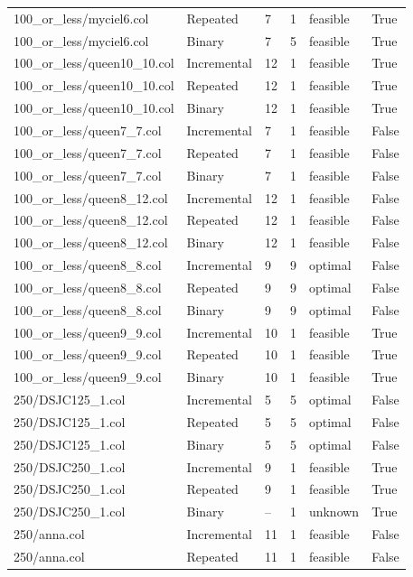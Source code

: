 \begin{table}[htbp]
\begin{tabular}{llllll}
100\_or\_less/myciel6.col & Repeated & 7 & 1 & feasible & True \\
100\_or\_less/myciel6.col & Binary & 7 & 5 & feasible & True \\
100\_or\_less/queen10\_10.col & Incremental & 12 & 1 & feasible & True \\
100\_or\_less/queen10\_10.col & Repeated & 12 & 1 & feasible & True \\
100\_or\_less/queen10\_10.col & Binary & 12 & 1 & feasible & True \\
100\_or\_less/queen7\_7.col & Incremental & 7 & 1 & feasible & False \\
100\_or\_less/queen7\_7.col & Repeated & 7 & 1 & feasible & False \\
100\_or\_less/queen7\_7.col & Binary & 7 & 1 & feasible & False \\
100\_or\_less/queen8\_12.col & Incremental & 12 & 1 & feasible & False \\
100\_or\_less/queen8\_12.col & Repeated & 12 & 1 & feasible & False \\
100\_or\_less/queen8\_12.col & Binary & 12 & 1 & feasible & False \\
100\_or\_less/queen8\_8.col & Incremental & 9 & 9 & optimal & False \\
100\_or\_less/queen8\_8.col & Repeated & 9 & 9 & optimal & False \\
100\_or\_less/queen8\_8.col & Binary & 9 & 9 & optimal & False \\
100\_or\_less/queen9\_9.col & Incremental & 10 & 1 & feasible & True \\
100\_or\_less/queen9\_9.col & Repeated & 10 & 1 & feasible & True \\
100\_or\_less/queen9\_9.col & Binary & 10 & 1 & feasible & True \\
250/DSJC125\_1.col & Incremental & 5 & 5 & optimal & False \\
250/DSJC125\_1.col & Repeated & 5 & 5 & optimal & False \\
250/DSJC125\_1.col & Binary & 5 & 5 & optimal & False \\
250/DSJC250\_1.col & Incremental & 9 & 1 & feasible & True \\
250/DSJC250\_1.col & Repeated & 9 & 1 & feasible & True \\
250/DSJC250\_1.col & Binary & -- & 1 & unknown & True \\
250/anna.col & Incremental & 11 & 1 & feasible & False \\
250/anna.col & Repeated & 11 & 1 & feasible & False \\

\end{tabular}
\end{table}
